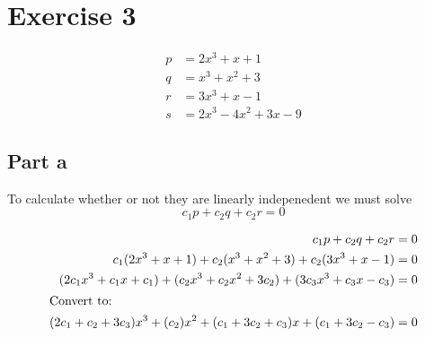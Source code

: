 \section{Exercise 3}
\begin{align*}
	p & = 2x^3 + x + 1         \\
	q & = x^3 + x^2 + 3        \\
	r & = 3x^3 + x - 1         \\
	s & = 2x^3 - 4x^2 + 3x - 9
\end{align*}

\subsection{Part a}
To calculate whether or not they are linearly indepenedent we must solve
\[
	c_1 p + c_2 q + c_2 r = 0
\]

\begin{align*}
	c_1 p + c_2 q + c_2 r                                                           & = 0 \\
	c_1(2x^3 + x + 1) + c_2(x^3 + x^2 + 3) + c_2(3x^3 + x - 1)                      & = 0 \\
	(2c_1 x^3 + c_1 x + c_1) + (c_2 x^3 + c_2 x^2 + 3c_2) + (3c_3 x^3 +c_3 x - c_3) & = 0 \\
	\intertext{Convert to:}
	(2c_1 + c_2 + 3c_3)x^3 + (c_2)x^2 + (c_1 + 3c_2 + c_3)x + (c_1 + 3c_2 - c_3)    & = 0
\end{align*}

